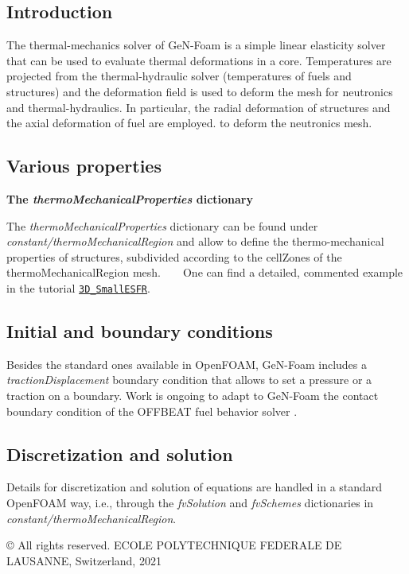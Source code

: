 \subsection*{Introduction}

The thermal-\/mechanics solver of Ge\+N-\/\+Foam is a simple linear elasticity solver that can be used to evaluate thermal deformations in a core. Temperatures are projected from the thermal-\/hydraulic solver (temperatures of fuels and structures) and the deformation field is used to deform the mesh for neutronics and thermal-\/hydraulics. In particular, the radial deformation of structures and the axial deformation of fuel are employed. to deform the neutronics mesh.

\subsection*{Various properties}

 {\bfseries The {\itshape thermo\+Mechanical\+Properties} dictionary}

The {\itshape thermo\+Mechanical\+Properties} dictionary can be found under {\itshape constant/thermo\+Mechanical\+Region} and allow to define the thermo-\/mechanical properties of structures, subdivided according to the cell\+Zones of the thermo\+Mechanical\+Region mesh. ~\newline
~\newline
One can find a detailed, commented example in the tutorial \href{https://gitlab.com/foam-for-nuclear/GeN-Foam/-/tree/master/Tutorials/3D_SmallESFR/rootCase/constant/thermoMechanicalRegion/thermoMechanicalProperties}{\tt 3\+D\+\_\+\+Small\+E\+S\+FR}.  ~\newline


\subsection*{Initial and boundary conditions}

Besides the standard ones available in Open\+F\+O\+AM, Ge\+N-\/\+Foam includes a {\itshape traction\+Displacement} boundary condition that allows to set a pressure or a traction on a boundary. Work is ongoing to adapt to Ge\+N-\/\+Foam the contact boundary condition of the O\+F\+F\+B\+E\+AT fuel behavior solver \cite{SCOLARO2020110416}.

\subsection*{Discretization and solution}

Details for discretization and solution of equations are handled in a standard Open\+F\+O\+AM way, i.\+e., through the {\itshape fv\+Solution} and {\itshape fv\+Schemes} dictionaries in {\itshape constant/thermo\+Mechanical\+Region}.

© All rights reserved. E\+C\+O\+LE P\+O\+L\+Y\+T\+E\+C\+H\+N\+I\+Q\+UE F\+E\+D\+E\+R\+A\+LE DE L\+A\+U\+S\+A\+N\+NE, Switzerland, 2021 